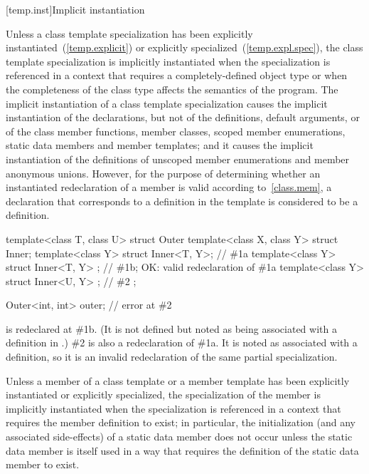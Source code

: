 [temp.inst]{Implicit instantiation}

\pnum
{}%
Unless a class template specialization has been explicitly
instantiated~(\ref{temp.explicit}) or explicitly
specialized~(\ref{temp.expl.spec}),
the class template specialization is implicitly instantiated when the
specialization is referenced in a context that requires a completely-defined
object type or when the completeness of the class type affects the semantics
of the program.
The implicit instantiation of a class template specialization causes
the implicit instantiation of the declarations, but not of the definitions,
default arguments, or  of the class member functions,
member classes, scoped member enumerations, static data members and member templates; and it causes the
implicit instantiation of the definitions of unscoped member enumerations and member anonymous unions.
However, for the purpose of determining whether an instantiated redeclaration
of a member is valid according to~\ref{class.mem}, a declaration that
corresponds to a definition in the template is considered to be a
definition.
\enterexample
\begin{codeblock}
template<class T, class U>
struct Outer {
  template<class X, class Y> struct Inner;
  template<class Y> struct Inner<T, Y>;         // \#1a
  template<class Y> struct Inner<T, Y> { };     // \#1b; OK: valid redeclaration of \#1a
  template<class Y> struct Inner<U, Y> { };     // \#2
};

Outer<int, int> outer;                          // error at \#2
\end{codeblock}

 is redeclared at \#1b. (It is not defined
but noted as being associated with a definition in .) \#2
is also a redeclaration of \#1a. It is noted as associated with a definition,
so it is an invalid redeclaration of the same partial specialization.
\exitexample

\pnum
Unless a member of a class template or a member template has been explicitly
instantiated or explicitly specialized,
the specialization of the member is implicitly instantiated when the
specialization is referenced in a context that requires the member definition
to exist;
in particular, the initialization (and any associated side-effects) of a
static data member does not occur unless the static data member is itself used
in a way that requires the definition of the static data member to exist.

